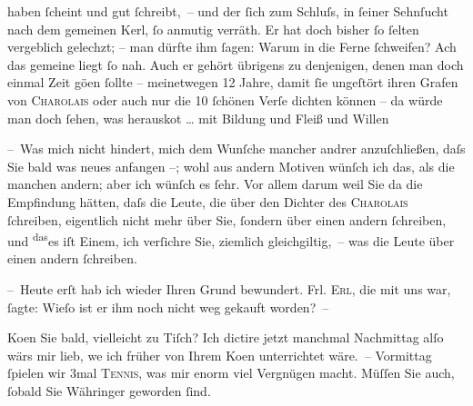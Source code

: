                haben ſcheint und gut ſchreibt, – und der ſich zum Schluſs, in ſeiner Sehnſucht {\pb}nach dem gemeinen Kerl, ſo anmutig verräth. Er hat
               doch bisher ſo ſelten vergeblich gelechzt; – man dürfte ihm ſagen: Warum in die Ferne
               ſchweifen? Ach das gemeine liegt ſo nah. Auch er gehört übrigens zu denjenigen, denen
               man doch einmal Zeit gö{\geminationn}en ſollte – meinetwegen 12
               Jahre, damit ſie ungeſtört ihren Grafen von \textsc{Charolais} oder auch nur die 10 ſchönen Verſe dichten können – da{\geminationn} würde man doch {\pb}ſehen,
               was herausko{\geminationm}t {\dots} mit Bildung
               und Fleiß und Willen {\dotsfour}\pend
           
\pstart
           – Was mich nicht hindert, mich dem Wunſche mancher andrer anzuſchließen, daſs Sie
               bald was neues anfangen –; wohl aus andern Motiven wünſch ich das, als die manchen
               andern; aber ich wünſch es ſehr. Vor allem darum weil Sie da{\geminationn} die Empfindung hätten, daſs die Leute, die über den
               Dichter des \textsc{Charolais} ſchreiben, eigentlich nicht mehr über Sie, ſondern über {\pb}einen andern ſchreiben, und \substVorne{}\textsuperscript{das}\substDazwischen{}es\substHinten{} iſt Einem, ich verſichre Sie,  ziemlich gleichgiltig, – was die Leute über einen andern ſchreiben.\pend
           
\pstart
           – Heute erſt hab ich wieder Ihren Grund bewundert. Frl. \textsc{Erl}, die mit uns war, ſagte: Wieſo ist er ihm noch nicht weg gekauft worden? –\pend
           
\pstart
           Ko{\geminationm}en Sie bald, vielleicht zu Tiſch? Ich dictire jetzt
               manchmal Nachmittag alſo wärs mir lieb, we{\geminationn} ich früher
               von Ihrem Ko{\geminationm}en unterrichtet {\pb}wäre. – Vormittag ſpielen wir 3mal \textsc{Tennis}, was mir enorm viel Vergnügen macht. Müſſen Sie auch,
               ſobald Sie Währinger geworden ſind.\pend
           
